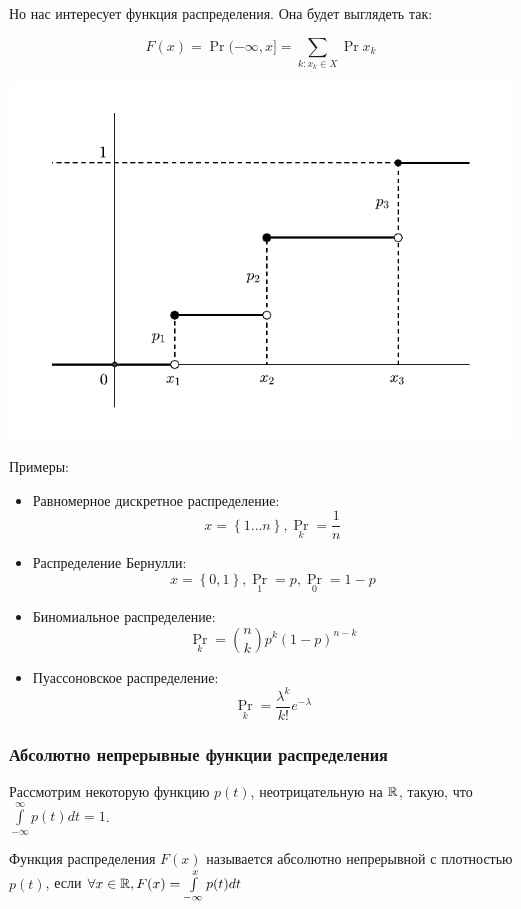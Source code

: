     Но нас интересует функция распределения. Она будет выглядеть так:

    \[
        F(x) = \Pr{(-\infty, x]} = \sum\limits_{k: x_k \in X} \Pr{x_k}
    \]

    \includegraphics[width=15cm]{Lec_8_1.pdf}

    Примеры:

    \begin{itemize}
        \item Равномерное дискретное распределение:
            \[
                x = \left\{ 1\ldots n \right\}, \Pr_k = \frac{1}{n}
            \]

        \item Распределение Бернулли:
            \[
                x = \left\{ 0, 1 \right\}, \Pr_1 = p, \Pr_0 = 1-p
            \]
        \item Биномиальное распределение:
            \[
                \Pr_k = \binom{n}{k}p^k(1-p)^{n-k}
            \]
        \item Пуассоновское распределение:
            \[
                \Pr_k = \frac{\lambda^k}{k!}e^{-\lambda}
            \]
    \end{itemize}

\subsubsection{Абсолютно непрерывные функции распределения}

    Рассмотрим некоторую функцию $p(t)$, неотрицательную на $\mathbb{R}$, такую, что
    $\int\limits_{-\infty}^{\infty} p(t)dt = 1$.

    \begin{definition}
        Функция распределения $F(x)$ называется абсолютно непрерывной с плотностью $p(t)$, если $\forall x
        \in \mathbb{R}, F(x) = \int\limits_{-\infty}^{x} p(t)dt$
    \end{definition}

